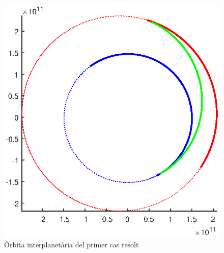 \begin{figure}[H]
	\centering
	\includegraphics[scale=0.8]{./plots/ex1}
	\caption{Òrbita interplanetària del primer cas resolt}
\end{figure}


